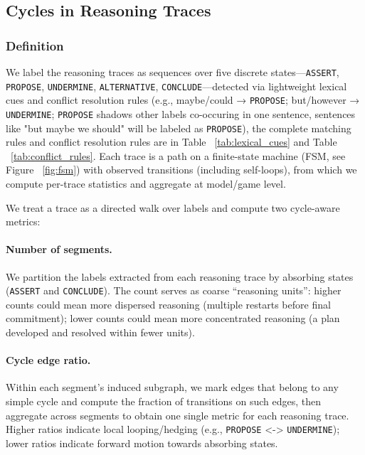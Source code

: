 \documentclass[../main.tex]{subfiles}
\begin{document}
\subsection{Cycles in Reasoning Traces}
\label{sec:cyclic_analysis}

\subsubsection{Definition}

We label the reasoning traces as sequences over five discrete states—\texttt{ASSERT}, \texttt{PROPOSE}, \texttt{UNDERMINE}, \texttt{ALTERNATIVE}, \texttt{CONCLUDE}—detected via lightweight lexical cues and conflict resolution rules (e.g., maybe/could → \texttt{PROPOSE}; but/however → \texttt{UNDERMINE}; \texttt{PROPOSE} shadows other labels co-occuring in one sentence, sentences like "but maybe we should" will be labeled as \texttt{PROPOSE}), the complete matching rules and conflict resolution rules are in Table ~\ref{tab:lexical_cues} and Table ~\ref{tab:conflict_rules}. Each trace is a path on a finite-state machine (FSM, see Figure ~\ref{fig:fsm}) with observed transitions (including self-loops), from which we compute per-trace statistics and aggregate at model/game level.

We treat a trace as a directed walk over labels and compute two cycle-aware metrics:

\paragraph{Number of segments.} We partition the labels extracted from each reasoning trace by absorbing states (\texttt{ASSERT} and  \texttt{CONCLUDE}). The count serves as coarse “reasoning units”: higher counts could mean more dispersed reasoning (multiple restarts before final commitment); lower counts could mean more concentrated reasoning (a plan developed and resolved within fewer units).

\paragraph{Cycle edge ratio.}\label{def:cycle_edge_ratio}
Within each segment’s induced subgraph, we mark edges that belong to any simple cycle and compute the fraction of transitions on such edges, then aggregate across segments to obtain one single metric for each reasoning trace. Higher ratios indicate local looping/hedging (e.g., \texttt{PROPOSE} <-> \texttt{UNDERMINE}); lower ratios indicate forward motion towards absorbing states.
\end{document}
